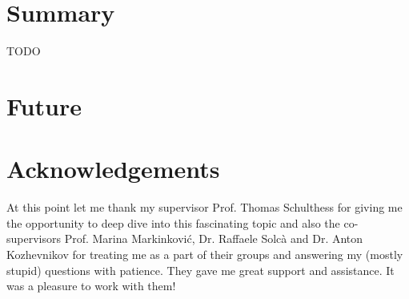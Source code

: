 \documentclass{article}
\theoremstyle{plain} %
\theoremstyle{convention} %
\theoremstyle{remark} %
\numberwithin{equation}{section}
\begin{document}
\section{Summary}

\label{sec:summary}

TODO

\section{Future}

\label{sec:future}

\section{Acknowledgements}

At this point let me thank my supervisor Prof. Thomas Schulthess for giving me the opportunity to deep dive into this fascinating topic and also the co-supervisors Prof. Marina Markinković, Dr. Raffaele Solcà and Dr. Anton Kozhevnikov for treating me as a part of their groups and answering my (mostly stupid) questions with patience. They gave me great support and assistance. It was a pleasure to work with them!
\end{document}
